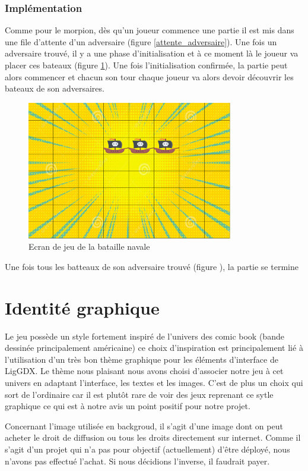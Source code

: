 \documentclass{report}
\begin{document}
\subsection{Implémentation}
Comme pour le morpion, dès qu'un joueur commence une partie il est mis dans une file d'attente d'un adversaire (figure \ref{attente_adversaire}).
Une fois un adversaire trouvé, il y a une phase d'initialisation et à ce moment là le joueur va placer ces bateaux (figure \ref{notreBataille}). Une fois l'initialisation confirmée,
la partie peut alors commencer et chacun son tour chaque joueur va alors devoir découvrir les bateaux de son adversaires.

\begin{figure}[H]
	\centering\includegraphics[width=9cm]{notreBataille}
	\caption{Ecran de jeu de la bataille navale}
	\label{notreBataille}
\end{figure}

Une fois tous les batteaux de son adversaire trouvé (figure ), la partie se termine


\chapter{Identité graphique}
Le jeu possède un style fortement inspiré de l'univers des comic book (bande dessinée principalement américaine)
ce choix d'inspiration est principalement lié à l'utilisation d'un très bon thème graphique pour les éléments
d'interface de LigGDX. Le thème nous plaisant nous avons choisi d'associer notre jeu à cet univers en adaptant l'interface, les
textes et les images. C'est de plus un choix qui sort de l'ordinaire car il est plutôt rare de voir des jeux
reprenant ce sytle graphique ce qui est à notre avis un point positif pour notre projet.
\par
Concernant l'image utilisée en backgroud, il s'agit d'une image dont on peut acheter le droit de diffusion ou tous les droits directement sur internet. Comme il s'agit d'un projet qui n'a pas pour objectif (actuellement) d'être déployé, nous n'avons pas effectué l'achat. Si nous décidions l'inverse, il faudrait payer.
\end{document}
